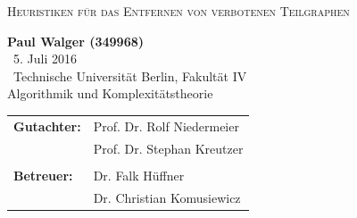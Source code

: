 \documentclass[12pt,a4paper,onecolumn,oneside,titlepage]{article}
\author{}
\title{}
\begin{document}
  \begin{titlepage}
   \centering
    \vspace{5cm}
    {\scshape\huge Heuristiken für das Entfernen von verbotenen Teilgraphen\par}
      \vspace{1cm}
    {\large\bf Paul Walger (349968)}\\
      \vspace{1cm}
    {\large\ 5. Juli 2016}\\
      \vspace{1cm}
    {\large\ Technische Universität Berlin, Fakultät IV \\ Algorithmik und Komplexitätstheorie}\\
      \vspace{3cm}
      

\begin{tabular}{l  l}
\textbf{Gutachter:} & Prof. Dr. Rolf Niedermeier \\
 & Prof. Dr. Stephan Kreutzer \\\\
\textbf{Betreuer:} & Dr. Falk Hüffner \\
 & Dr. Christian Komusiewicz 
\end{tabular} 


      \vspace{1cm}
      
    \newpage
    

\end{titlepage}
\end{document}
